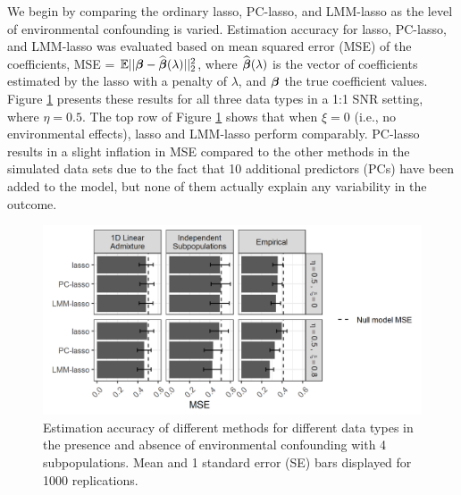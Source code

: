We begin by comparing the ordinary lasso, PC-lasso, and LMM-lasso as the level of environmental confounding is varied. Estimation accuracy for lasso, PC-lasso, and LMM-lasso was evaluated based on mean squared error (MSE) of the coefficients, MSE = $\mathbb{E}||\boldsymbol{\beta}{} - \widehat{\boldsymbol{\beta}{}}(\lambda)||^2_2$, where $\widehat{\boldsymbol{\beta}{}}(\lambda)$ is the vector of coefficients estimated by the lasso with a penalty of $\lambda$, and $\boldsymbol{\beta}{}$ the true coefficient values.
Figure \ref{fig:mse} presents these results for all three data types in a 1:1 SNR setting, where $\eta = 0.5$. The top row of Figure \ref{fig:mse} shows that when $\xi = 0$ (i.e., no environmental effects), lasso and LMM-lasso perform comparably. PC-lasso results in a slight inflation in MSE compared to the other methods in the simulated data sets due to the fact that 10 additional predictors (PCs) have been added to the model, but none of them actually explain any variability in the outcome. 

\begin{figure}[H]
    \centering
    \includegraphics[width = \textwidth]{figures/beta_mse.png}
    \caption{Estimation accuracy of different methods for different data types in the presence and absence of environmental confounding with 4 subpopulations. Mean and 1 standard error (SE) bars displayed for 1000 replications.}
    \label{fig:mse}
\end{figure}

